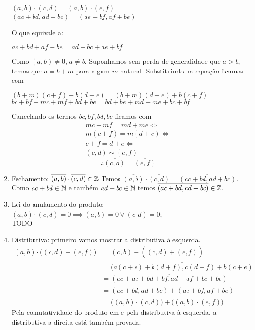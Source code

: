 \documentclass[../main.tex]{subfiles}
\begin{document}
\begin{dem}
\begin{enumerate}[label=(\roman*)]
        \begin{center}
            $\overline{(a,b)} \cdot \overline{(c,d)} = \overline{(a,b)} \cdot \overline{(e,f)}$ \\
            $\overline{(ac+bd, ad+bc)} = \overline{(ae+bf, af+be)}$
        \end{center}
        O que equivale a: 
        \begin{center}
            $ac+bd+af+be = ad+bc+ae+bf$
        \end{center}
        Como $\overline{(a,b)} \neq 0$, $a \neq b$. Suponhamos sem perda de generalidade que $a > b$, temos que $a = b + m$ para algum $m$ natural. Substituindo na equação ficamos com 
        \begin{center}
            $(b+m)(c+f)+ b(d+e) = (b+m)(d+e)+b(c+f)$ \\
            $bc + bf + mc + mf + bd + be = bd + be + md + me + bc + bf$
        \end{center}
        Cancelando os termos $bc, bf, bd, be$ ficamos com
        \[\begin{split}
             mc + mf = md + me \iff \\
            m(c+f) = m(d+e) \iff \\
            c+f = d+e \iff \\
            (c,d) \sim (e,f)           
        \end{split} \]
       $$\therefore \overline{(c,d)} = \overline{(e,f)}$$
        
        \item Fechamento: $\overline{(a,b)} \cdot \overline{(c,d)} \in \mathbb{Z}$
        Temos $\overline{(a,b)} \cdot \overline{(c,d)} = \overline{(ac+bd, ad+bc)}$. Como $ac+bd \in \mathbb{N}$ e também $ad+bc \in \mathbb{N}$ temos $\overline{(ac+bd, ad+bc)} \in \mathbb{Z}$.

        \item Lei do anulamento do produto:
            $\overline{(a,b)} \cdot \overline{(c,d)} = 0 \implies \overline{(a,b)} = 0 \lor \overline{(c,d)}=0$; \\
            TODO
        \item Distributiva: primeiro vamos mostrar a distributiva à esquerda.
        \begin{align*}
            \overline{(a,b)} \cdot \big( \overline{(c,d)} + \overline{(e,f)} \big) &= \overline{(a,b)} + (\overline{(c,d)} + \overline{(e,f)}) \\
            &= \overline{(a(c+e) + b(d+f), a(d+f) +b(c+e)} \\
            &= \overline{(ac+ae+bd+bf, ad+af+bc+be)} \\
            &= \overline{(ac+bd, ad+bc)} + \overline{(ae+bf, af+be)} \\
            &= \big( \overline{(a,b)} \cdot \overline{(c,d)} \big) + \big( \overline{(a,b)} \cdot \overline{(e,f)} \big)    
        \end{align*}
        Pela comutatividade do produto em \Z e pela distributiva à esquerda, a distributiva a direita está também provada.
        
    \end{enumerate}
\end{dem}
\end{document}
